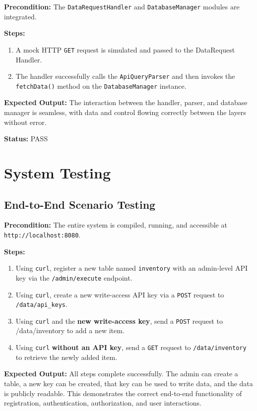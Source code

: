 \documentclass[12pt, a4paper]{report}
\begin{document}
\noindent\textbf{Precondition:} The \lstinline|DataRequestHandler| and \lstinline|DatabaseManager| modules are integrated.

\noindent\textbf{Steps:}
\begin{enumerate}
    \item A mock HTTP \lstinline|GET| request is simulated and passed to the DataRequest Handler.
    \item The handler successfully calls the \lstinline|ApiQueryParser| and then invokes the \lstinline|fetchData()| method on the \lstinline|DatabaseManager| instance.
\end{enumerate}

\noindent\textbf{Expected Output:} The interaction between the handler, parser, and database manager is seamless, with data and control flowing correctly between the layers without error.

\noindent\textbf{Status:} PASS



\section{System Testing}

\subsection{End-to-End Scenario Testing}

\noindent\textbf{Precondition:} The entire system is compiled, running, and accessible at \lstinline|http://localhost:8080|.

\noindent\textbf{Steps:}
\begin{enumerate}
    \item Using \lstinline|curl|, register a new table named \lstinline|inventory| with an admin-level API key via the \lstinline|/admin/execute| endpoint.
    \item Using \lstinline|curl|, create a new write-access API key via a \lstinline|POST| request to \lstinline|/data/api_keys|.
    \item Using \lstinline|curl| and the \textbf{new write-access key}, send a \lstinline|POST| request to /data/inventory to add a new item.
    \item Using \lstinline|curl| \textbf{without an API key}, send a \lstinline|GET| request to \lstinline|/data/inventory| to retrieve the newly added item.
\end{enumerate}

\noindent\textbf{Expected Output:} All steps complete successfully. The admin can create a table, a new key can be created, that key can be used to write data, and the data is publicly readable. This demonstrates the correct end-to-end functionality of registration, authentication, authorization, and user interactions.
\end{document}
